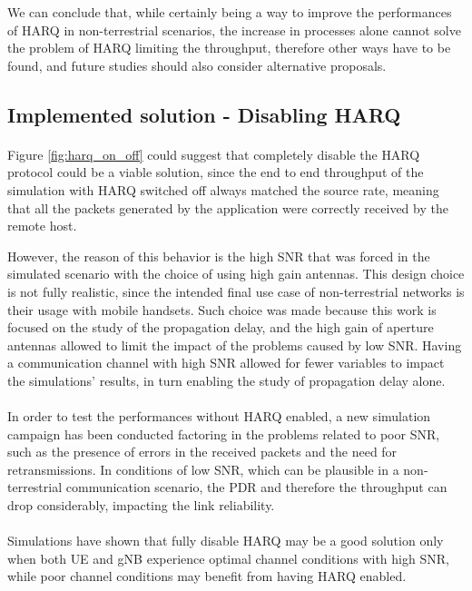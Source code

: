 We can conclude that, while certainly being a way to improve the performances of \ac{HARQ} in non-terrestrial scenarios, the increase in processes alone cannot solve the problem of \ac{HARQ} limiting the throughput, therefore other ways have to be found, and future studies should also consider alternative proposals.

\subsection{Implemented solution - Disabling HARQ}
\paragraph{}
Figure \ref{fig:harq_on_off} could suggest that completely disable the \ac{HARQ} protocol could be a viable solution, since the end to end throughput of the simulation with \ac{HARQ} switched off always matched the source rate, meaning that all the packets generated by the application were correctly received by the remote host.

However, the reason of this behavior is the high \ac{SNR} that was forced in the simulated scenario with the choice of using high gain antennas. This design choice is not fully realistic, since the intended final use case of non-terrestrial networks is their usage with mobile handsets. Such choice was made because this work is focused on the study of the propagation delay, and the high gain of aperture antennas allowed to limit the impact of the problems caused by low \ac{SNR}. Having a communication channel with high \ac{SNR} allowed for fewer variables to impact the simulations' results, in turn enabling the study of propagation delay alone.

\paragraph{}
In order to test the performances without \ac{HARQ} enabled, a new simulation campaign has been conducted factoring in the problems related to poor \ac{SNR}, such as the presence of errors in the received packets and the need for retransmissions. In conditions of low \ac{SNR}, which can be plausible in a non-terrestrial communication scenario, the \ac{PDR} and therefore the throughput can drop considerably, impacting the link reliability.
\paragraph{}
Simulations have shown that fully disable \ac{HARQ} may be a good solution only when both \ac{UE} and \ac{gNB} experience optimal channel conditions with high \ac{SNR}, while poor channel conditions may benefit from having \ac{HARQ} enabled.

